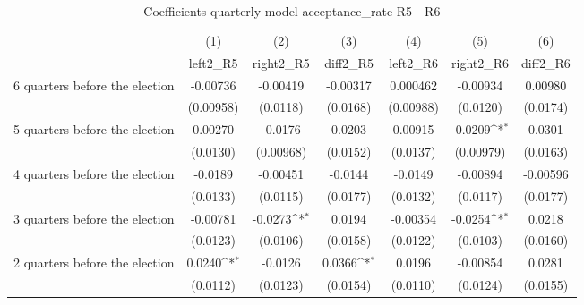 \begin{table}[!ht]\centering \footnotesize
\def\sym#1{\ifmmode^{#1}\else\(^{#1}\)\fi}
\caption{Coefficients quarterly model acceptance\_rate R5 - R6}
\begin{tabular}{l*{6}{c}}
\hline\hline
                    &\multicolumn{1}{c}{(1)}&\multicolumn{1}{c}{(2)}&\multicolumn{1}{c}{(3)}&\multicolumn{1}{c}{(4)}&\multicolumn{1}{c}{(5)}&\multicolumn{1}{c}{(6)}\\
                    &\multicolumn{1}{c}{left2\_R5}&\multicolumn{1}{c}{right2\_R5}&\multicolumn{1}{c}{diff2\_R5}&\multicolumn{1}{c}{left2\_R6}&\multicolumn{1}{c}{right2\_R6}&\multicolumn{1}{c}{diff2\_R6}\\
\hline
 6 quarters before the election&    -0.00736         &    -0.00419         &    -0.00317         &    0.000462         &    -0.00934         &     0.00980         \\
                    &   (0.00958)         &    (0.0118)         &    (0.0168)         &   (0.00988)         &    (0.0120)         &    (0.0174)         \\
[1em]
 5 quarters before the election&     0.00270         &     -0.0176         &      0.0203         &     0.00915         &     -0.0209\sym{*}  &      0.0301         \\
                    &    (0.0130)         &   (0.00968)         &    (0.0152)         &    (0.0137)         &   (0.00979)         &    (0.0163)         \\
[1em]
 4 quarters before the election&     -0.0189         &    -0.00451         &     -0.0144         &     -0.0149         &    -0.00894         &    -0.00596         \\
                    &    (0.0133)         &    (0.0115)         &    (0.0177)         &    (0.0132)         &    (0.0117)         &    (0.0177)         \\
[1em]
 3 quarters before the election&    -0.00781         &     -0.0273\sym{*}  &      0.0194         &    -0.00354         &     -0.0254\sym{*}  &      0.0218         \\
                    &    (0.0123)         &    (0.0106)         &    (0.0158)         &    (0.0122)         &    (0.0103)         &    (0.0160)         \\
[1em]
 2 quarters before the election&      0.0240\sym{*}  &     -0.0126         &      0.0366\sym{*}  &      0.0196         &    -0.00854         &      0.0281         \\
                    &    (0.0112)         &    (0.0123)         &    (0.0154)         &    (0.0110)         &    (0.0124)         &    (0.0155)         \\

\end{tabular}
\end{table}
